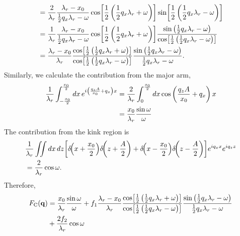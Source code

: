 \begin{align}
  &= \frac{2}{\lambda_r}\frac{\lambda_r-x_0}{\frac{1}{2}q_x\lambda_r - \omega} 
     \cos\mathopen{}\left[ \frac{1}{2}\left(\frac{1}{2}q_x\lambda_r + \omega\right) \right]\mathclose{} 
     \sin\mathopen{}\left[ \frac{1}{2}\left(\frac{1}{2}q_x\lambda_r - \omega\right) \right]\mathclose{} \nonumber\\
  &= \frac{1}{\lambda_r}\frac{\lambda_r-x_0}{\frac{1}{2}q_x\lambda_r - \omega} 
     \cos\mathopen{}\left[ \frac{1}{2}\left(\frac{1}{2}q_x\lambda_r + \omega\right) \right]\mathclose{} 
     \frac{\sin\left(\frac{1}{2}q_x\lambda_r - \omega \right)}
          {\cos\mathopen{}\left[ \frac{1}{2}\left(\frac{1}{2}q_x\lambda_r - \omega\right) \right]\mathclose{}} \nonumber\\
  &= \frac{\lambda_r-x_0}{\lambda_r}
     \frac{\cos\mathopen{}\left[ \frac{1}{2}\left(\frac{1}{2}q_x\lambda_r + \omega\right) \right]\mathclose{}}
          {\cos\mathopen{}\left[ \frac{1}{2}\left(\frac{1}{2}q_x\lambda_r - \omega\right) \right]\mathclose{}}
     \frac{\sin\left(\frac{1}{2}q_x\lambda_r - \omega\right)}
          {\frac{1}{2}q_x\lambda_r - \omega}.
\end{align}
Similarly, we calculate the contribution from the major arm,
\begin{align}
  \frac{1}{\lambda_r}\int_{-\frac{x_0}{2}}^{\frac{x_0}{2}}\mathop{dx} 
  e^{i\left(\frac{q_zA}{x_0} + q_x \right)x}
  &= \frac{2}{\lambda_r}\int_{0}^{\frac{x_0}{2}}\mathop{dx} \cos\left(\frac{q_zA}{x_0} + q_x\right)x \nonumber\\ 
  &= \frac{x_0}{\lambda_r}\frac{\sin\omega}{\omega}
\end{align}
The contribution from the kink region is 
\begin{align}
  & \frac{1}{\lambda_r}\iint\mathop{dx}\mathop{dz}
  \mathopen{}\left[ \delta\!\mathopen{}\left( x+\frac{x_0}{2} \right)\mathclose{}\delta\!\mathopen{}\left( z+\frac{A}{2} \right)\mathclose{} 
   + \delta\!\mathopen{}\left( x-\frac{x_0}{2} \right)\mathclose{}\delta\!\mathopen{}\left( z-\frac{A}{2} \right)\mathclose{} \right]\mathclose{}
  e^{iq_xx} e^{iq_zz} \nonumber\\
  &= \frac{2}{\lambda_r}\cos\omega.
\end{align}
Therefore,
\begin{align}
  F_\mathrm{C}(\mathbf{q}) 
  &= \frac{x_0}{\lambda_r}\frac{\sin\omega}{\omega} + 
  f_1\frac{\lambda_r-x_0}{\lambda_r}
  \frac{\cos\mathopen{}\left[ \frac{1}{2}\left(\frac{1}{2}q_x\lambda_r + \omega\right) \right]\mathclose{}}
       {\cos\mathopen{}\left[ \frac{1}{2}\left(\frac{1}{2}q_x\lambda_r - \omega\right) \right]\mathclose{}}
  \frac{\sin\left(\frac{1}{2}q_x\lambda_r - \omega\right)}
       {\frac{1}{2}q_x\lambda_r - \omega} \nonumber\\
  &+ \frac{2f_2}{\lambda_r}\cos\omega
  \label{eq:FC}
\end{align}

